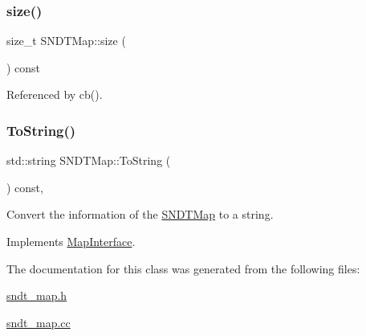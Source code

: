 \mbox{\label{classSNDTMap_a5dadf53cf219ea37fb6bba8c70b41a5e}} 
\subsubsection{\texorpdfstring{size()}{size()}}
{\footnotesize\ttfamily size\+\_\+t S\+N\+D\+T\+Map\+::size (\begin{DoxyParamCaption}{ }\end{DoxyParamCaption}) const\hspace{0.3cm}{\ttfamily [inline]}}



Referenced by cb().

\mbox{\label{classSNDTMap_a38be62c377da486f006e194e24e77212}} 
\subsubsection{\texorpdfstring{To\+String()}{ToString()}}
{\footnotesize\ttfamily std\+::string S\+N\+D\+T\+Map\+::\+To\+String (\begin{DoxyParamCaption}{ }\end{DoxyParamCaption}) const\hspace{0.3cm}{\ttfamily [override]}, {\ttfamily [virtual]}}



Convert the information of the \hyperlink{classSNDTMap}{S\+N\+D\+T\+Map} to a string. 



Implements \hyperlink{classMapInterface_a87b132e1a619eb21e0ac684fc25f8c74}{Map\+Interface}.



The documentation for this class was generated from the following files\+:\begin{DoxyCompactItemize}
\item 
\hyperlink{sndt__map_8h}{sndt\+\_\+map.\+h}\item 
\hyperlink{sndt__map_8cc}{sndt\+\_\+map.\+cc}\end{DoxyCompactItemize}

